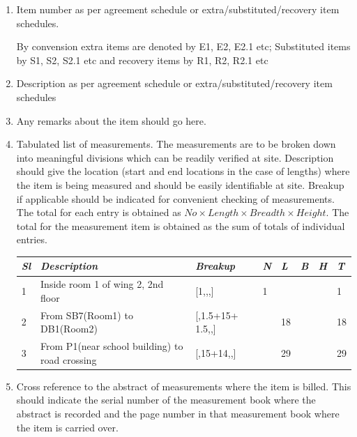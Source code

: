 \documentclass[twoside,a4paper]{refart}
\newenvironment{noteblock}[1]%
{\begin{mdframed}[topline=false,bottomline=false, rightline=false,
		linewidth=2pt, frametitle={#1}]}%
		{\end{mdframed}}
\begin{document}
	 \begin{enumerate}
	 	\item Item number as per agreement schedule or extra/substituted/recovery item schedules. \\
	 	
	 	\begin{noteblock}{Note:}
	 		By convension extra items are denoted by E1, E2, E2.1 etc; Substituted items by S1, S2, S2.1 etc and recovery items by R1, R2, R2.1 etc
	 	\end{noteblock}
	 	
	 	\item Description as per agreement schedule or extra/substituted/recovery item schedules
	 	\item Any remarks about the item should go here.
	 	\item Tabulated list of measurements. The measurements are to be broken down into meaningful divisions which can be readily verified at site. Description should give the location (start and end locations in the case of lengths) where the item is being measured and should be easily identifiable at site. Breakup if applicable should be indicated for convenient checking of measurements. The total for each entry is obtained as $No \times Length \times Breadth \times Height$. The total for the measurement item is obtained as the sum of totals of individual entries.\\
	 	
	 	\begin{noteblock}{Examples:}
	 		\begin{small}
	 			\begin{longtabu} to \textwidth {X[1,c] X[10,l] X[5,l] X[1,r] X[1,r] X[1,r] X[1,r] X[1,r]}
	 				\hline
	 				\emph{Sl} & \emph{Description} & \emph{Breakup} & \emph{N} & \emph{L} & \emph{B} & \emph{H} & \emph{T} \\
	 				\hline
	 				 & Inside room 1 of wing 2, 2nd floor & [1,,,] & 1 &  &  &  & 1\\ 
	 				2 & From SB7(Room1) to DB1(Room2) & [,1.5+15+ 1.5,,] &  & 18 &  &  & 18\\ 
	 				3 & From P1(near school building) to road crossing & [,15+14,,] &  & 29 &  &  & 29\\ 
	 			\end{longtabu}
	 		\end{small}
	 	\end{noteblock}
	 	
	 	\item Cross reference to the abstract of measurements where the item is billed. This should  indicate the serial number of the measurement book where the abstract is recorded and the page number in that measurement book where the item is carried over.
	 \end{enumerate}
	 
\end{document}
